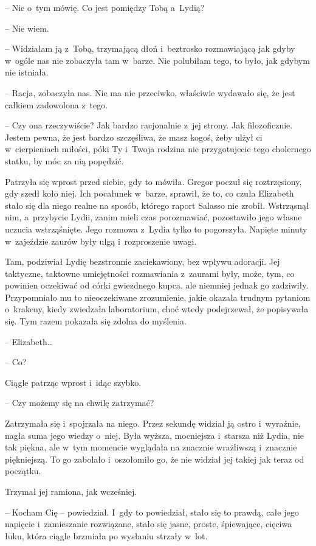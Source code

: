 \documentclass[oneside,polish,12pt,sfheadings]{mwbk}
\begin{document}
-- Nie o~tym mówię. Co jest pomiędzy Tobą a~Lydią?

-- Nie wiem.

-- Widziałam ją z~Tobą, trzymającą dłoń i~beztrosko rozmawiającą jak
gdyby w~ogóle nas nie zobaczyła tam w~barze. Nie polubiłam tego, to
było, jak gdybym nie istniała.

-- Racja, zobaczyła nas. Nie ma nic przeciwko, właściwie wydawało się, że
jest całkiem zadowolona z~tego.

-- Czy ona rzeczywiście? Jak bardzo racjonalnie z~jej strony. Jak
filozoficznie. Jestem pewna, że jest bardzo szczęśliwa, że masz kogoś,
żeby ulżył ci w~cierpieniach miłości, póki Ty i~Twoja rodzina nie
przygotujecie tego cholernego statku, by móc za nią popędzić.

Patrzyła się wprost przed siebie, gdy to mówiła. Gregor poczuł się
roztrzęsiony, gdy szedł koło niej. Ich pocałunek w~barze, sprawił, że
to, co czuła Elizabeth stało się dla niego realne na sposób, którego
raport Salasso nie zrobił. Wstrząsnął nim, a~przybycie Lydii, zanim
mieli czas porozmawiać, pozostawiło jego własne uczucia wstrząśnięte.
Jego rozmowa z~Lydia tylko to pogorszyła. Napięte minuty w~zajeździe
zaurów były ulgą i~rozproszenie uwagi.

Tam, podziwiał Lydię bezstronnie zaciekawiony, bez wpływu adoracji. Jej
taktyczne, taktowne umiejętności rozmawiania z~zaurami były, może, tym,
co powinien oczekiwać od córki gwiezdnego kupca, ale niemniej jednak go
zadziwiły. Przypomniało mu to nieoczekiwane zrozumienie, jakie okazała
trudnym pytaniom o~krakeny, kiedy zwiedzała laboratorium, choć wtedy
podejrzewał, że popisywała się. Tym razem pokazała się zdolna do
myślenia.

-- Elizabeth\ldots

-- Co?

Ciągle patrząc wprost i~idąc szybko.

-- Czy możemy się na chwilę zatrzymać?

Zatrzymała się i~spojrzała na niego. Przez sekundę widział ją ostro i~wyraźnie, nagła suma jego wiedzy o~niej. Była wyższa, mocniejsza i~starsza niż Lydia, nie tak piękna, ale w~tym momencie wyglądała na
znacznie wrażliwszą i~znacznie piękniejszą. To go zabolało i~oszołomiło
go, że nie widział jej takiej jak teraz od początku.

Trzymał jej ramiona, jak wcześniej.

-- Kocham Cię -- powiedział. I~gdy to powiedział, stało się to prawdą,
całe jego napięcie i~zamieszanie rozwiązane, stało się jasne, proste,
śpiewające, cięciwa łuku, która ciągle brzmiała po wysłaniu strzały w~lot.
\end{document}
